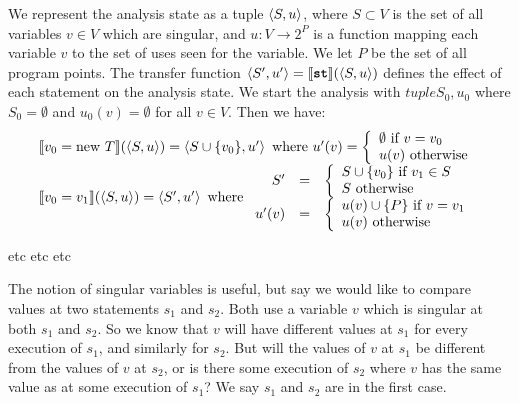 \documentclass[11pt,notitlepage]{article}
\begin{document}
We represent the analysis state as a tuple $\left\langle S, u \right\rangle$, where $S
\subset V$ is the set of all variables $v \in V$ which are singular,
and $u:V \to 2^P$ is a function mapping each variable $v$ to the set
of uses seen for the variable.  We let $P$ be the set of all program
points.
The transfer function
$\left\langle S',u' \right\rangle =
  \llbracket\text{\texttt{\textbf{st}}}\rrbracket (\left\langle S,u \right\rangle)$
defines the effect of each statement  on the analysis state.
We start the analysis with $tuple{S_0, u_0}$ where $S_0 = \emptyset$
and $u_0(v) = \emptyset$ for all $v \in V$.  Then we have:
\begin{displaymath}
\begin{array}{l}
\llbracket v_0 = \text{new } T \rrbracket (\left\langle S, u \right\rangle) =
 \left\langle S \cup \{ v_0 \}, u' \right\rangle \text{ where }
    u'(v) = \left\{\begin{array}{l}
      \emptyset \text{ if } v = v_0 \\
      u(v) \text{ otherwise} \\
    \end{array} \right.
\\
\llbracket v_0 = v_1 \rrbracket (\left\langle S, u \right\rangle) =
 \left\langle S', u' \right\rangle \text{ where }
   \begin{array}{rcl}
     S' &=& \left\{\begin{array}{l}
       S \cup \{ v_0 \} \text{ if } v_1 \in S \\
       S \text{ otherwise } \\
     \end{array} \right.
     \\
     u'(v) &=& \left\{\begin{array}{l}
        u(v) \cup \{ P \} \text{ if } v=v_1 \\
        u(v) \text{ otherwise } \\
     \end{array} \right.
   \end{array}
\\

\end{array}
\end{displaymath}

etc etc etc

The notion of singular variables is useful, but say we would like to
compare values at two statements $s_1$ and $s_2$.  Both use a variable
$v$ which is singular at both $s_1$ and $s_2$.  So we know that $v$
will have different values at $s_1$ for every execution of $s_1$, and
similarly for $s_2$.  But will the values of $v$ at $s_1$ be different
from the values of $v$ at $s_2$, or is there some execution of $s_2$
where $v$ has the same value as at some execution of $s_1$?  We say
$s_1$ and $s_2$ are  in the first case.
\end{document}

